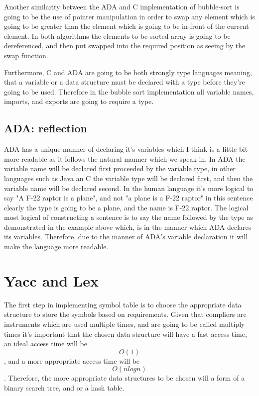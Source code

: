 \documentclass[
	12pt, %
]{fphw}
\begin{document}
Another similarity between the ADA and C implementation of bubble-sort is going
to be the use of pointer manipulation in order to swap any element which is
going to be greater than the element which is going to be in-front of the current
element. In both algorithms the elements to be sorted array is going to be
dereferenced, and then put swapped into the required position as seeing by the
swap function.\par


Furthermore, C and ADA are going to be both strongly type languages meaning,
that a variable or a data structure must be declared with a type before they're
going to be used. Therefore in the bubble sort implementation all variable names,
imports, and exports are going to require a type.

\subsection{ADA: reflection}
ADA has a unique manner of declaring it's variables which I think is a little bit
more readable as it follows the natural manner which we speak in. In ADA the variable
name will be declared first proceeded by the variable type, in other languages
such as Java an C the variable type will be declared first, and then the variable
name will be declared second. In the human language it's more logical to say
"A F-22 raptor is a plane", and not "a plane is a F-22 raptor" in this sentence
clearly the type is going to be a plane, and the name is F-22 raptor. The logical
most logical of constructing a sentence is to say the name followed by the type as
demonstrated in the example above which, is in the manner which ADA declares its
variables. Therefore, due to the manner of ADA's variable declaration  it will
make the language more readable.

\section{Yacc and Lex}
The first step in implementing symbol table is to choose the appropriate data
structure to store the symbols based on requirements. Given that compliers are
instruments which are used multiple times, and are going to be called multiply times
it's important that the chosen data structure will have a fast access time, an
ideal access time will be $$O(1)$$, and a more appropriate access time will be
$$O(nlogn)$$. Therefore, the more appropriate data structures to be chosen
will a form of a binary search tree, and or a hash table.\par
\end{document}
